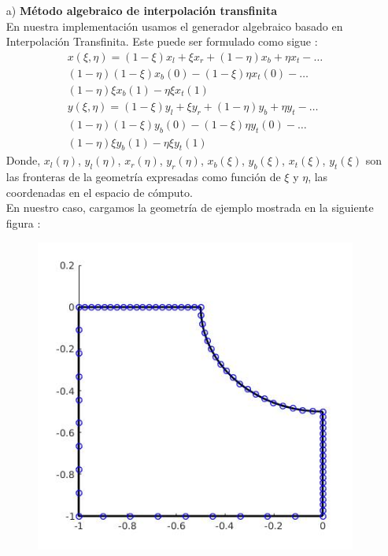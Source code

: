 \documentclass{article}
\begin{document}
\begin{enumerate}
\begin{itemize}
\begin{itemize}
		\item[a)] \textbf{ M\'etodo algebraico de interpolaci\'on transfinita }
		\\
		En nuestra implementaci\'on usamos el generador algebraico basado en Interpolaci\'on Transfinita. Este puede ser formulado como sigue :
		\begin{gather*}
		x( \xi, \eta ) = ( 1 - \xi ) x_{l} + \xi x_{r} + ( 1 - \eta ) x_{b} + \eta x_{t} - \hdots \\
						 ( 1 - \eta ) ( 1 - \xi ) x_{b}(0) - ( 1 - \xi ) \eta x_{t}(0) - \hdots \\
						 ( 1 - \eta ) \xi x_{b}(1) - \eta \xi x_{t}(1)
		\\
		y( \xi, \eta ) = ( 1 - \xi ) y_{l} + \xi y_{r} + ( 1 - \eta ) y_{b} + \eta y_{t} - \hdots \\
						 ( 1 - \eta ) ( 1 - \xi ) y_{b}(0) - ( 1 - \xi ) \eta y_{t}(0) - \hdots \\
						 ( 1 - \eta ) \xi y_{b}(1) - \eta \xi y_{t}(1)
		\end{gather*}
		Donde, $x_l(\eta)$, $y_l(\eta)$, $x_r(\eta)$, $y_r(\eta)$, $x_b(\xi)$, $y_b(\xi)$, $x_t(\xi)$, $y_t(\xi)$ son las
		fronteras de la geometr\'ia expresadas como funci\'on de $ \xi $ y $ \eta $, las coordenadas en el espacio de 
		c\'omputo.
		\\
		En nuestro caso, cargamos la geometr\'ia de ejemplo mostrada en la siguiente figura :
		\begin{figure}[H]
			\centering
			\includegraphics[scale=0.5]{./imgs/img_geometry.jpg}

\end{figure}
\end{itemize}
\end{itemize}
\end{enumerate}
\end{document}
